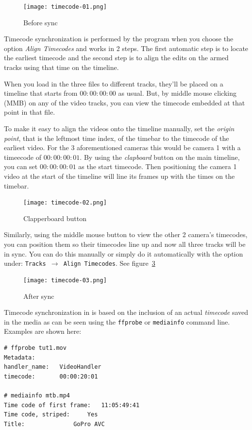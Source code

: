 \begin{figure}[ht]
	\centering
	\texttt{[image: timecode-01.png]}
	\caption{Before sync}
	\label{fig:timecode-01}
\end{figure}

Timecode synchronization is performed by the program when you choose the option \textit{Align Timecodes} and works in 2 steps. The first automatic step is to locate the earliest timecode and the second step is to align the edits on the armed tracks using that time on the timeline. 

When you load in the three files to different tracks, they'll be placed on a timeline that starts from $00:00:00:00$ as usual. But, by middle mouse clicking (MMB) on any of the video tracks, you can view the timecode embedded at that point in that file.

To make it easy to align the videos onto the timeline manually, set the \textit{origin point}, that is the leftmost time index, of the timebar to the timecode of the earliest video.  For the 3 aforementioned cameras this would be camera 1 with a timeecode of $00:00:00:01$.  By using the \textit{clapboard} button on the main timeline, you can set $00:00:00:01$ as the start timecode. Then positioning the camera 1 video at the start of the timeline will line its frames up with the times on the timebar.

\begin{figure}[ht]
	\centering
	\texttt{[image: timecode-02.png]}
	\caption{Clapperboard button}
	\label{fig:timecode-02}
\end{figure}

Similarly, using the middle mouse button to view the other 2 camera’s timecodes, you can position them  so their timecodes line up and now all three tracks will be in sync.  You can do this manually or simply do it automatically with the option under: \texttt{Tracks  $\rightarrow$  Align Timecodes}. See figure~\ref{fig:timecode-03}

\begin{figure}[ht]
	\centering
	\texttt{[image: timecode-03.png]}
	\caption{After sync}
	\label{fig:timecode-03}
\end{figure}

Timecode synchronization in \CGG{} is based on the inclusion of an actual \textit{timecode} saved in
the media as can be seen using the \texttt{ffprobe} or \texttt{mediainfo} command line. Examples are shown here:

\begin{lstlisting}[style=sh]
# ffprobe tut1.mov
Metadata:
handler_name:	VideoHandler
timecode:		00:00:20:01

# mediainfo mtb.mp4
Time code of first frame:	11:05:49:41
Time code, striped:		Yes
Title:				GoPro AVC
\end{lstlisting}

